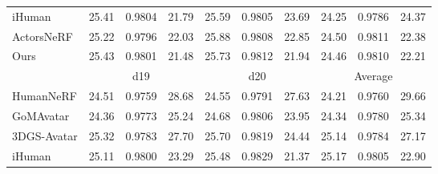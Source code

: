 \begin{table}[t]
\begin{adjustbox}{width=1.0\linewidth}
\begin{tabular}{l|rrr|rrr|rrr}
{\color[HTML]{9B9B9B} iHuman}    & {\color[HTML]{9B9B9B} 25.41} & {\color[HTML]{9B9B9B} 0.9804} & {\color[HTML]{9B9B9B} 21.79} & {\color[HTML]{9B9B9B} 25.59} & {\color[HTML]{9B9B9B} 0.9805} & {\color[HTML]{9B9B9B} 23.69} & {\color[HTML]{9B9B9B} 24.25} & {\color[HTML]{9B9B9B} 0.9786} & {\color[HTML]{9B9B9B} 24.37} \\
ActorsNeRF                        & 25.22                        & 0.9796                        & 22.03                        & 25.88                        & 0.9808                        & 22.85                        & 24.50                        & 0.9811                        & 22.38                        \\
Ours                             & 25.43                        & 0.9801                        & 21.48                        & 25.73                        & 0.9812                        & 21.94                        & 24.46                        & 0.9810                        & 22.21                        \\ \midrule
\rowcolor[HTML]{EFEFEF} 
                                 & \multicolumn{3}{c|}{\cellcolor[HTML]{EFEFEF}d19}                                             & \multicolumn{3}{c|}{\cellcolor[HTML]{EFEFEF}d20}                                             & \multicolumn{3}{c}{\cellcolor[HTML]{EFEFEF}Average}                                         \\
{\color[HTML]{9B9B9B} HumanNeRF} & {\color[HTML]{9B9B9B} 24.51} & {\color[HTML]{9B9B9B} 0.9759} & {\color[HTML]{9B9B9B} 28.68} & {\color[HTML]{9B9B9B} 24.55} & {\color[HTML]{9B9B9B} 0.9791} & {\color[HTML]{9B9B9B} 27.63} & {\color[HTML]{9B9B9B} 24.21} & {\color[HTML]{9B9B9B} 0.9760} & {\color[HTML]{9B9B9B} 29.66} \\
{\color[HTML]{9B9B9B} GoMAvatar} & {\color[HTML]{9B9B9B} 24.36} & {\color[HTML]{9B9B9B} 0.9773} & {\color[HTML]{9B9B9B} 25.24} & {\color[HTML]{9B9B9B} 24.68} & {\color[HTML]{9B9B9B} 0.9806} & {\color[HTML]{9B9B9B} 23.95} & {\color[HTML]{9B9B9B} 24.34} & {\color[HTML]{9B9B9B} 0.9780} & {\color[HTML]{9B9B9B} 25.34} \\
{\color[HTML]{9B9B9B} 3DGS-Avatar}    & {\color[HTML]{9B9B9B} 25.32} & {\color[HTML]{9B9B9B} 0.9783} & {\color[HTML]{9B9B9B} 27.70} & {\color[HTML]{9B9B9B} 25.70} & {\color[HTML]{9B9B9B} 0.9819} & {\color[HTML]{9B9B9B} 24.44} & {\color[HTML]{9B9B9B} 25.14} & {\color[HTML]{9B9B9B} 0.9784} & {\color[HTML]{9B9B9B} 27.17} \\
{\color[HTML]{9B9B9B} iHuman}    & {\color[HTML]{9B9B9B} 25.11} & {\color[HTML]{9B9B9B} 0.9800} & {\color[HTML]{9B9B9B} 23.29} & {\color[HTML]{9B9B9B} 25.48} & {\color[HTML]{9B9B9B} 0.9829} & {\color[HTML]{9B9B9B} 21.37} & {\color[HTML]{9B9B9B} 25.17} & {\color[HTML]{9B9B9B} 0.9805} & {\color[HTML]{9B9B9B} 22.90} \\

\end{tabular}
\end{adjustbox}
\end{table}
